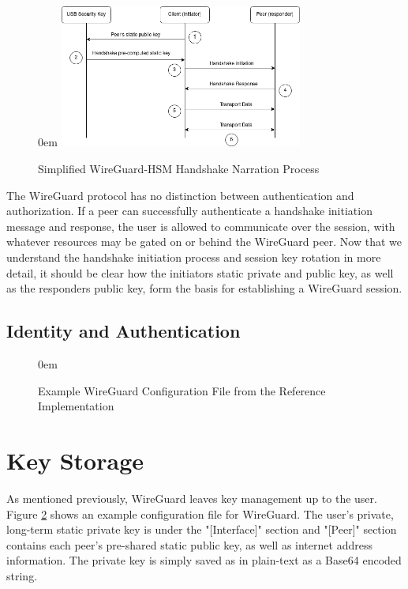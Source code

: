 \documentclass [11pt, proquest] {uwthesis}[2020/02/24]
\begin{document}
\begin{figure}
\itemsep0em 
\includegraphics[width=8cm]{paper/images/Process_Diagram.png}
\caption{Simplified WireGuard-HSM Handshake Narration Process}
\label{fig:handshake_process}
\end{figure}
The WireGuard protocol has no distinction between authentication and authorization. If a peer can successfully authenticate a handshake initiation message and response, the user is allowed to communicate over the session, with whatever resources may be gated on or behind the WireGuard peer.
Now that we understand the handshake initiation process and session key rotation in more detail, it should be clear how the initiators static private and public key, as well as the responders public key, form the basis for establishing a WireGuard session.
\\


\subsection {Identity and Authentication}
\label{identity}

\begin{figure}
\itemsep0em 
\caption{Example WireGuard Configuration File from the Reference Implementation}
\label{fig:wg_config}
\end{figure}

\section{Key Storage}
As mentioned previously, WireGuard leaves key management up to the user.
Figure \ref{fig:wg_config} shows an example configuration file for WireGuard. The user's private, long-term static private key is under the "[Interface]" section and "[Peer]" section contains each peer's pre-shared static public key, as well as internet address information. The private key is simply saved as in plain-text as a Base64 encoded string.
\end{document}
